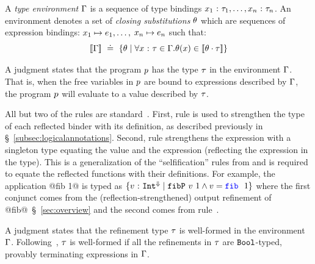 A \emph{type environment} $\Gamma$ is a sequence of type bindings
${x_1} \ \text{:}\ {\tau_1},\ldots,{x_n} \ \text{:}\ {\tau_n}$. An environment
denotes a set of \emph{closing substitutions} $\theta$ which are
sequences of expression bindings:
${x_1} \mapsto {e_1}, \ldots,$ ${x_n} \mapsto {e_n}$ such that:
$$
[\![\Gamma]\!] \ \doteq\   \{\theta \mid \forall {x} \ \text{:}\ {\tau} \in \Gamma.
                                    \theta(x) \in [\![{\theta} \cdot {\ensuremath{\tau}} ]\!] \}
$$



A judgment \hastype{\env}{\prog}{\typ} states that
the program $p$ has the type $\tau$ in
the environment $\Gamma$.
That is, when the free variables in $p$ are
bound to expressions described by $\Gamma$, the
program $p$ will evaluate to a value
described by $\tau$.

%
All but two of the rules are standard~\cite{Knowles10,Vazou14}.
%
First, rule \rtreflect is used to strengthen the type of each
reflected binder with its definition, as described previously
in \S~\ref{subsec:logicalannotations}.
%
Second, rule \rtexact strengthens the expression with
a singleton type equating the value and the expression
(\ie reflecting the expression in the type).
%
This is a generalization of the ``selfification'' rules
from \cite{Ou2004,Knowles10} and is required to
equate the reflected functions with their definitions.
%
For example, the application @fib 1@ is typed as
${\tref{v}{\tint^\tlabel}{\fibdef\ v\ 1 \wedge v = \fib\ 1}}$ where
the first conjunct comes from the (reflection-strengthened)
output refinement of @fib@~\S~\ref{sec:overview} and
the second comes from rule~\rtexact.
%

%
A judgment \iswellformed{\env}{\typ} states that
the refinement type $\tau$ is well-formed in
the environment $\Gamma$.
%
Following~\citet{Vazou14}, $\tau$ is well-formed if all
the refinements in $\tau$ are $\mathtt{Bool}$-typed,
provably terminating expressions in $\Gamma$.


